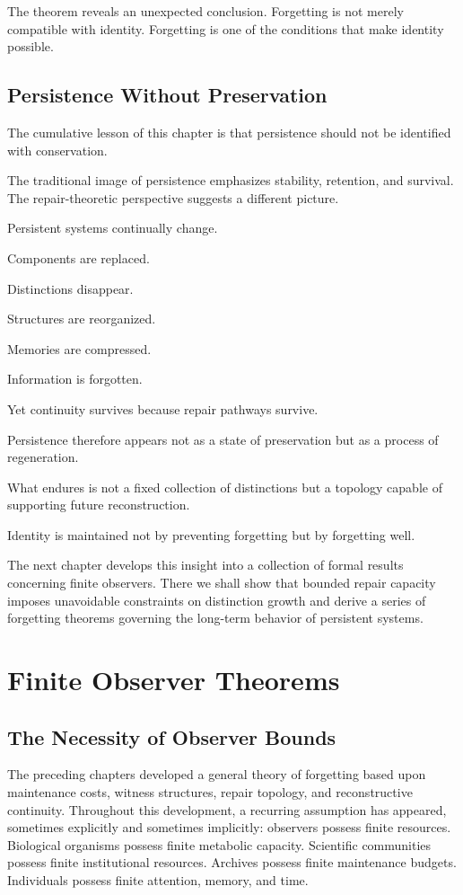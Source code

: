 \documentclass[12pt,oneside]{book}
\theoremstyle{plain} \newtheorem{theorem}{Theorem}[chapter] \newtheorem{lemma}[theorem]{Lemma} \newtheorem{proposition}[theorem]{Proposition} \newtheorem{corollary}[theorem]{Corollary}
\theoremstyle{definition} \newtheorem{definition}[theorem]{Definition} \newtheorem{axiom}[theorem]{Axiom} \newtheorem{construction}[theorem]{Construction}
\theoremstyle{remark} \newtheorem{remark}[theorem]{Remark} \newtheorem{example}[theorem]{Example}
\begin{document}
The theorem reveals an unexpected conclusion. Forgetting is not merely compatible with identity. Forgetting is one of the conditions that make identity possible.

\section{Persistence Without Preservation}

The cumulative lesson of this chapter is that persistence should not be identified with conservation.

The traditional image of persistence emphasizes stability, retention, and survival. The repair-theoretic perspective suggests a different picture.

Persistent systems continually change.

Components are replaced.

Distinctions disappear.

Structures are reorganized.

Memories are compressed.

Information is forgotten.

Yet continuity survives because repair pathways survive.

Persistence therefore appears not as a state of preservation but as a process of regeneration.

What endures is not a fixed collection of distinctions but a topology capable of supporting future reconstruction.

Identity is maintained not by preventing forgetting but by forgetting well.

The next chapter develops this insight into a collection of formal results concerning finite observers. There we shall show that bounded repair capacity imposes unavoidable constraints on distinction growth and derive a series of forgetting theorems governing the long-term behavior of persistent systems.

\chapter{Finite Observer Theorems}

\section{The Necessity of Observer Bounds}

The preceding chapters developed a general theory of forgetting based upon maintenance costs, witness structures, repair topology, and reconstructive continuity. Throughout this development, a recurring assumption has appeared, sometimes explicitly and sometimes implicitly: observers possess finite resources. Biological organisms possess finite metabolic capacity. Scientific communities possess finite institutional resources. Archives possess finite maintenance budgets. Individuals possess finite attention, memory, and time.
\end{document}
